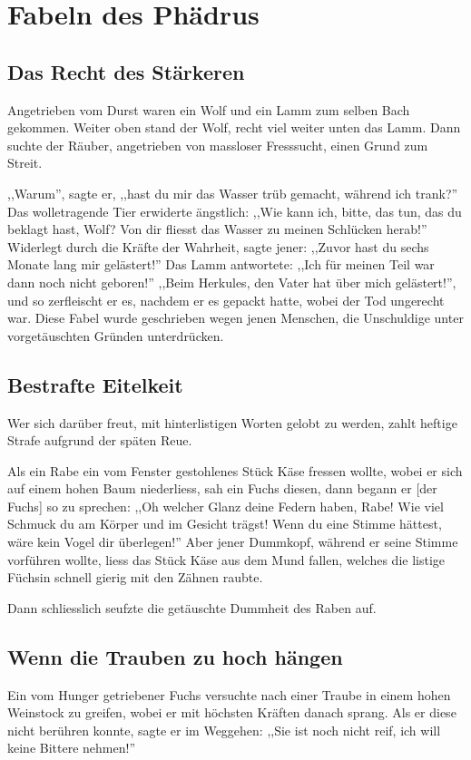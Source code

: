 \documentclass[a4paper]{article}
\begin{document}
\section{Fabeln des Phädrus}
\subsection{Das Recht des Stärkeren}
Angetrieben vom Durst waren ein Wolf und ein Lamm zum selben Bach gekommen. Weiter oben stand der Wolf, recht viel weiter unten das Lamm. Dann suchte der Räuber, angetrieben von massloser Fresssucht, einen Grund zum Streit. 

,,Warum'', sagte er, ,,hast du mir das Wasser trüb gemacht, während ich trank?''
Das wolletragende Tier erwiderte ängstlich: ,,Wie kann ich, bitte, das tun, das du beklagt hast, Wolf? Von dir fliesst das Wasser zu meinen Schlücken herab!''
Widerlegt durch die Kräfte der Wahrheit, sagte jener: ,,Zuvor hast du sechs Monate lang mir gelästert!'' Das Lamm antwortete: ,,Ich für meinen Teil war dann noch nicht geboren!'' ,,Beim Herkules, den Vater hat über mich gelästert!'', und so zerfleischt er es, nachdem er es gepackt hatte, wobei der Tod ungerecht war.
Diese Fabel wurde geschrieben wegen jenen Menschen, die Unschuldige unter vorgetäuschten Gründen unterdrücken.

\subsection{Bestrafte Eitelkeit}
Wer sich darüber freut, mit hinterlistigen Worten gelobt zu werden, zahlt heftige Strafe aufgrund der späten Reue. 

Als ein Rabe ein vom Fenster gestohlenes Stück Käse fressen wollte, wobei er sich auf einem hohen Baum niederliess, sah ein Fuchs diesen, dann begann er [der Fuchs] so zu sprechen:
,,Oh welcher Glanz deine Federn haben, Rabe! Wie viel Schmuck du am Körper und im Gesicht trägst! Wenn du eine Stimme hättest, wäre kein Vogel dir überlegen!''
Aber jener Dummkopf, während er seine Stimme vorführen wollte, liess das Stück Käse aus dem Mund fallen, welches die listige Füchsin schnell gierig mit den Zähnen raubte.

Dann schliesslich seufzte die getäuschte Dummheit des Raben auf.

\subsection{Wenn die Trauben zu hoch hängen}
Ein vom Hunger getriebener Fuchs versuchte nach einer Traube in einem hohen Weinstock zu greifen, wobei er mit höchsten Kräften danach sprang. Als er diese nicht berühren konnte, sagte er im Weggehen: ,,Sie ist noch nicht reif, ich will keine Bittere nehmen!''
\end{document}
